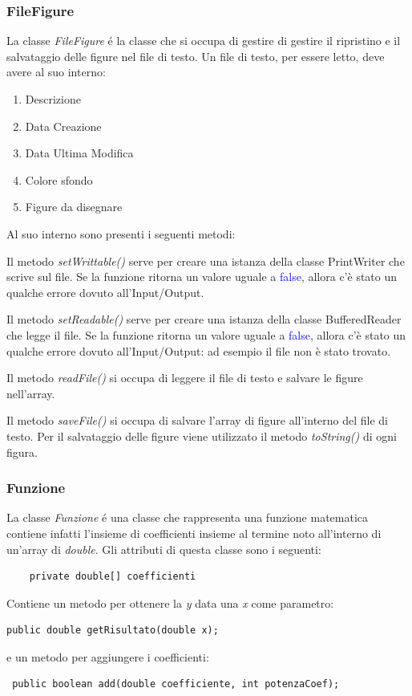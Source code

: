 \documentclass[a4paper,12pt,times,numbered,print,index]{article}
\begin{document}
\subsubsection{FileFigure}
La classe \textit{FileFigure} é la classe che si occupa di gestire di gestire il ripristino e il salvataggio delle figure nel file di testo.
Un file di testo, per essere letto, deve avere al suo interno:
\begin{enumerate}
\item Descrizione
\item Data Creazione
\item Data Ultima Modifica
\item Colore sfondo
\item Figure da disegnare
\end{enumerate}
Al suo interno sono presenti i seguenti metodi:

Il metodo \textit{setWrittable()} serve per creare una istanza della classe PrintWriter che scrive sul file. Se la funzione ritorna un valore uguale a \textcolor{blue}{false}, allora c'è stato un qualche errore dovuto all'Input/Output.

Il metodo \textit{setReadable()} serve per creare una istanza della classe BufferedReader che legge il file. Se la funzione ritorna un valore uguale a \textcolor{blue}{false}, allora c'è stato un qualche errore dovuto all'Input/Output: ad esempio il file non è stato trovato.


Il metodo \textit{readFile()} si occupa di leggere il file di testo e salvare le figure nell'array.

Il metodo \textit{saveFile()} si occupa di salvare l'array di figure all'interno del file di testo. Per il salvataggio delle figure viene utilizzato il metodo \textit{toString()} di ogni figura.

\subsubsection{Funzione}
La classe \textit{Funzione} é una classe che rappresenta una funzione matematica contiene infatti l'insieme di coefficienti insieme al termine noto all'interno di un'array di \textit{double}.
Gli attributi di questa classe sono i seguenti:
\begin{lstlisting}
	private double[] coefficienti
\end{lstlisting}
Contiene un metodo per ottenere la \textit{y} data una \textit{x} come parametro:
\begin{lstlisting}
public double getRisultato(double x);
\end{lstlisting}
e un metodo per aggiungere i coefficienti:
\begin{lstlisting}
 public boolean add(double coefficiente, int potenzaCoef);
\end{lstlisting}
\end{document}
